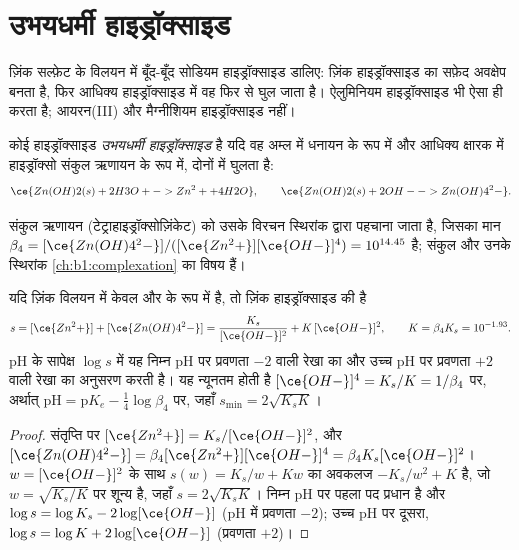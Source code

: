 \section{उभयधर्मी हाइड्रॉक्साइड}\label{sec:b1:precipitation:amphoteric}

ज़िंक सल्फ़ेट के विलयन में बूँद-बूँद सोडियम हाइड्रॉक्साइड डालिए: ज़िंक हाइड्रॉक्साइड का
सफ़ेद अवक्षेप बनता है, फिर आधिक्य हाइड्रॉक्साइड में वह फिर से घुल जाता है।
ऐलुमिनियम हाइड्रॉक्साइड भी ऐसा ही करता है; आयरन(III) और
मैग्नीशियम हाइड्रॉक्साइड नहीं।

\begin{definition}[उभयधर्मी हाइड्रॉक्साइड]\label{def:b1:precipitation:amphoteric-hydroxide}
कोई हाइड्रॉक्साइड \emph{उभयधर्मी हाइड्रॉक्साइड} है
यदि वह अम्ल में धनायन के रूप में और आधिक्य क्षारक में
हाइड्रॉक्सो संकुल ऋणायन के रूप में, दोनों में घुलता है:
\[
  \ce{Zn(OH)2(s) + 2H3O+ -> Zn^2+ + 4H2O}, \qquad
  \ce{Zn(OH)2(s) + 2OH- -> Zn(OH)4^2-} .
\]
\end{definition}

संकुल ऋणायन  (टेट्राहाइड्रॉक्सोज़िंकेट) को उसके
विरचन स्थिरांक द्वारा पहचाना जाता है, जिसका मान
$\beta_4 = [\ce{Zn(OH)4^2-}]/([\ce{Zn^2+}][\ce{OH-}]^4) = 10^{14.45}$ है; संकुल और उनके स्थिरांक
\cref{ch:b1:complexation} का विषय हैं।

\begin{proposition}[उभयधर्मी हाइड्रॉक्साइड की विलेयता]\label{prop:b1:precipitation:amphoteric}
यदि ज़िंक विलयन में केवल  और  के रूप में है, तो
ज़िंक हाइड्रॉक्साइड की  है
\[
  s = [\ce{Zn^2+}] + [\ce{Zn(OH)4^2-}] = \frac{K_s}{[\ce{OH-}]^2} + K\,[\ce{OH-}]^2,
  \qquad K = \beta_4 K_s = 10^{-1.93} .
\]
pH के सापेक्ष $\log s$ में यह निम्न pH पर प्रवणता $-2$ वाली रेखा का और
उच्च pH पर प्रवणता $+2$ वाली रेखा का अनुसरण करती है। यह न्यूनतम होती है
$[\ce{OH-}]^4 = K_s/K = 1/\beta_4$ पर, अर्थात् $\mathrm{pH} =
\mathrm{p}K_e - \frac14\log\beta_4$ पर, जहाँ $s_{\min} = 2\sqrt{K_s K}$।
\end{proposition}

\begin{proof}
संतृप्ति पर $[\ce{Zn^2+}] = K_s/[\ce{OH-}]^2$, और
$[\ce{Zn(OH)4^2-}] = \beta_4[\ce{Zn^2+}][\ce{OH-}]^4 = \beta_4 K_s
[\ce{OH-}]^2$। $w = [\ce{OH-}]^2$ के साथ $s(w) = K_s/w + Kw$ का अवकलज
$-K_s/w^2 + K$ है, जो $w = \sqrt{K_s/K}$ पर शून्य है, जहाँ $s = 2\sqrt{K_s K}$।
निम्न pH पर पहला पद प्रधान है और $\log s = \log K_s - 2\log[\ce{OH-}]$
(pH में प्रवणता $-2$); उच्च pH पर दूसरा, $\log s = \log K + 2\log[\ce{OH-}]$
(प्रवणता $+2$)।
\end{proof}

